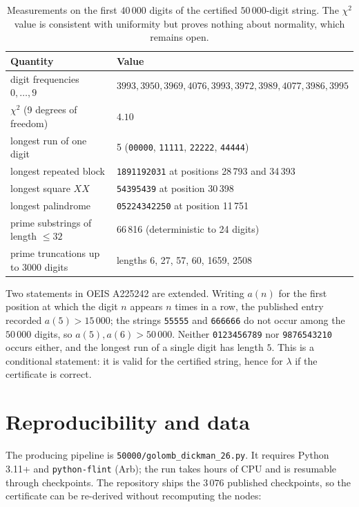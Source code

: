 \documentclass[11pt,a4paper]{article}
\theoremstyle{remark}
\newcommand{\lam}{\lambda}
\begin{document}
\begin{table}[ht]
\centering
\small
\begin{tabular}{@{}p{}p{}@{}}
\toprule
Quantity & Value \\
\midrule
digit frequencies $0,\ldots,9$ &
  $3993,3950,3969,4076,3993,3972,3989,4077,3986,3995$ \\
$\chi^2$ (9 degrees of freedom) & $4.10$ \\
longest run of one digit & 5 (\texttt{00000}, \texttt{11111}, \texttt{22222}, \texttt{44444}) \\
longest repeated block & \texttt{1891192031} at positions 28\,793 and 34\,393 \\
longest square $XX$ & \texttt{54395439} at position 30\,398 \\
longest palindrome & \texttt{05224342250} at position 11\,751 \\
prime substrings of length $\le32$ & 66\,816 (deterministic to 24 digits) \\
prime truncations up to 3000 digits & lengths 6, 27, 57, 60, 1659, 2508 \\
\bottomrule
\end{tabular}
\caption{Measurements on the first $40\,000$ digits of the certified
$50\,000$-digit string. The
$\chi^2$ value is consistent with uniformity but proves nothing about
normality, which remains open.}
\label{tab:digits}
\end{table}

Two statements in OEIS A225242 \cite{oeisA225242} are extended. Writing
$a(n)$ for the first position at which the digit $n$ appears $n$ times in
a row, the published entry recorded $a(5)>15\,000$; the strings
\texttt{55555} and \texttt{666666} do not occur among the $50\,000$
digits, so $a(5),a(6)>50\,000$. Neither \texttt{0123456789} nor
\texttt{9876543210} occurs either, and the longest run of a single digit
has length $5$. This is a conditional statement: it is
valid for the certified string, hence for $\lam$ if the certificate is
correct.

\section{Reproducibility and data}

The producing pipeline is \texttt{50000/golomb\_dickman\_26.py}. It requires
Python 3.11+ and \texttt{python-flint} \cite{pythonflint} (Arb); the run
takes hours of CPU and is resumable through checkpoints. The repository
ships the $3\,076$ published checkpoints, so the certificate can be
re-derived without recomputing the nodes:
\end{document}
